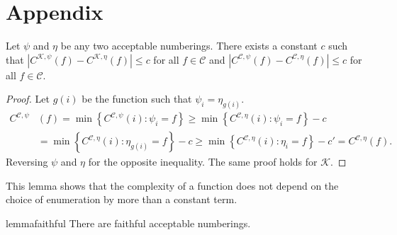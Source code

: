\documentclass{style/llncs}
\newcommand{\C}{\mathscr C}
\newcommand{\K}{\mathscr K}
\begin{document}
\section{Appendix}
\begin{lemma}
Let $\psi$ and $\eta$ be any two acceptable numberings. There exists a constant $c$ such that $\left| C^{\K,\psi}(f) - C^{\K, \eta}(f)\right | \leq c$ for all $f \in \C$ and $\left| C^{\C,\psi}(f) - C^{\C, \eta}(f)\right | \leq c$ for all $f \in \C$. \label{lemma:invariance}
\end{lemma}
\begin{proof}
Let $g(i)$ be the function such that $\psi_i=\eta_{g(i)}$.
\begin{align*}
C^{\C,\psi}&(f) = \min\left\{ C^{\C,\psi}(i) : \psi_i= f\right\} 
\geq \min\left\{ C^{\C, \eta}(i) : \psi_i= f\right\} - c\\
&= \min\left\{ C^{\C, \eta}(i) : \eta_{g(i)}= f\right\} - c
\geq \min\left\{ C^{\C, \eta}(i) : \eta_i= f\right\} - c' = C^{\C, \eta}(f).
\end{align*}
Reversing $\psi$ and $\eta$ for the opposite inequality. The same proof holds for $\K$.
\end{proof}
This lemma shows that the complexity of a function does not depend on the choice of
enumeration by more than a constant term.

\begin{restatable}{lemma}{faithful}\label{lemma:faithful-numberings}
  There are faithful acceptable numberings.
\end{restatable}
\end{document}
